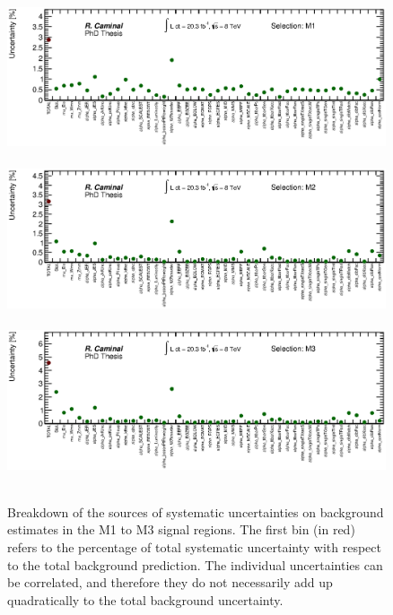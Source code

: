 \begin{figure}[!ht]
  \begin{center}
    \mbox{
      \includegraphics[width=0.995\textwidth]{MonojetAnalysis/Figures/totalSystematicPlot_SR_Stop_A6.eps}
    }
    \mbox{
      \includegraphics[width=0.995\textwidth]{MonojetAnalysis/Figures/totalSystematicPlot_SR_Stop_A3.eps}
    }
    \mbox{
      \includegraphics[width=0.995\textwidth]{MonojetAnalysis/Figures/totalSystematicPlot_SR_Stop_A4.eps}
    }
  \end{center}
  \caption[Breakdown of the sources of systematic uncertainties on background estimates in the M1 to M3 signal regions.]{Breakdown of the sources of systematic uncertainties on background estimates in the M1 to M3 signal regions. The first bin (in red) refers to the percentage of total systematic uncertainty with respect to the total background prediction. The individual uncertainties can be correlated, and therefore they do not necessarily add up quadratically to the total background uncertainty.}
  \label{fig:SystematicUncertaintiesSR}
\end{figure}


